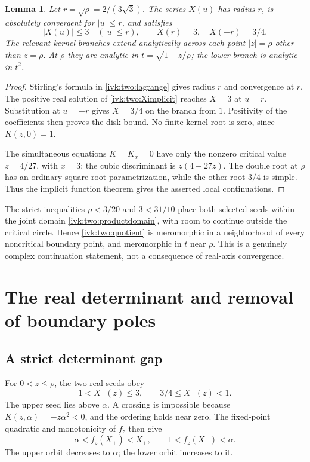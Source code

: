 \documentclass[11pt,letterpaper]{article}
\newtheorem{lemma}[theorem]{Lemma}
\theoremstyle{remark}\newtheorem{remark}[theorem]{Remark}
\begin{document}
\begin{lemma}\label{ivk:two:seedbounds}
Let $r=\sqrt\rho=2/(3\sqrt3)$. The series $X(u)$ has radius $r$,
is absolutely convergent for $|u|\le r$, and satisfies
\begin{equation}\label{ivk:two:Xbounds}
 |X(u)|\le3\quad(|u|\le r),\qquad X(r)=3,\quad X(-r)=3/4.
\end{equation}
The relevant kernel branches extend analytically across each point
$|z|=\rho$ other than $z=\rho$. At $\rho$ they are analytic in
$t=\sqrt{1-z/\rho}$; the lower branch is analytic in $t^2$.
\end{lemma}
\begin{proof}
Stirling's formula in \eqref{ivk:two:lagrange} gives radius $r$ and convergence
at $r$. The positive real solution of \eqref{ivk:two:Ximplicit} reaches
$X=3$ at $u=r$. Substitution at $u=-r$ gives $X=3/4$ on the branch
from $1$. Positivity of the coefficients then proves the disk bound.
No finite kernel root is zero, since $K(z,0)=1$.

The simultaneous equations $K=K_x=0$ have only the nonzero critical
value $z=4/27$, with $x=3$; the cubic discriminant is
$z(4-27z)$. The double root at $\rho$ has an ordinary square-root
parametrization, while the other root $3/4$ is simple. Thus the
implicit function theorem gives the asserted local continuations.
\end{proof}
The strict inequalities $\rho<3/20$ and $3<31/10$ place both selected
seeds within the joint domain \eqref{ivk:two:productdomain}, with room to
continue outside the critical circle. Hence \eqref{ivk:two:quotient} is
meromorphic in a neighborhood of every noncritical boundary point,
and meromorphic in $t$ near $\rho$. This is a genuinely complex
continuation statement, not a consequence of real-axis convergence.

\section{The real determinant and removal of boundary poles}
\subsection{A strict determinant gap}
For $0<z\le\rho$, the two real seeds obey
\[
 1<X_+(z)\le3,\qquad 3/4\le X_-(z)<1.
\]
The upper seed lies above $\alpha$. A crossing is impossible because
$K(z,\alpha)=-z\alpha^2<0$, and the ordering holds near zero.
The fixed-point quadratic and monotonicity of $f_z$ then give
\[
 \alpha<f_z(X_+)<X_+,\qquad 1<f_z(X_-)<\alpha.
\]
The upper orbit decreases to $\alpha$; the lower orbit increases to it.
\end{document}
